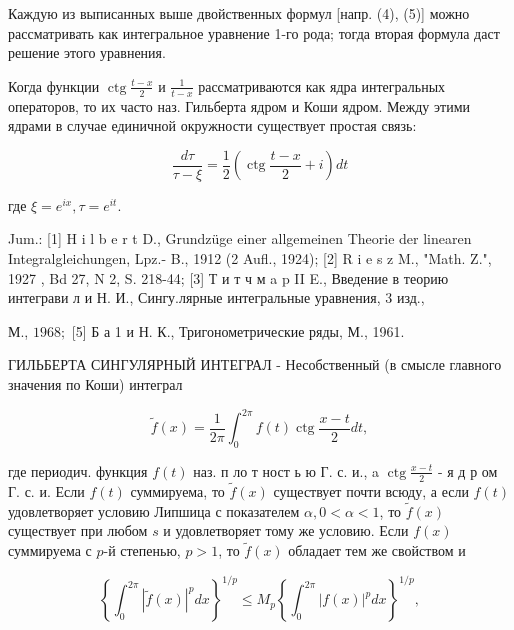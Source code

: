 \documentclass[10pt]{article}
\begin{document}
Каждую из выписанных выше двойственных формул [напр. (4), (5)] можно рассматривать как интегральное уравнение 1-го рода; тогда вторая формула даст решение этого уравнения.



Когда функции $\operatorname{ctg} \frac{t-x}{2}$ и $\frac{1}{t-x}$ рассматриваются как ядра интегральных операторов, то их часто наз. Гильберта ядром и Коши ядром. Между этими ядрами в случае единичной окружности существует простая связь:



\[

\frac{d \tau}{\tau-\xi}=\frac{1}{2}\left(\operatorname{ctg} \frac{t-x}{2}+i\right) d t

\]



где $\xi=e^{i x}, \tau=e^{i t}$.



Jum.: [1] H i l b e r t D., Grundzüge einer allgemeinen Theorie der linearen Integralgleichungen, Lpz.- B., 1912 (2 Aufl., 1924); [2] R i e s z M., "Math. Z.", 1927 , Bd 27, N 2, S. 218-44; [3] Т и т ч м a p II E., Введение в теорию интеграви л и Н. И., Сингу.лярные интегральные уравнения, 3 изд.,

М., $1968 ;$ [5] Б а 1 и Н. К., Тригонометрические ряды, М., 1961.



ГИЛЬБЕРТА СИНГУЛЯРНЫЙ ИНТЕГРАЛ - Несобственный (в смысле главного значения по Коши) интеграл



\[

\tilde{f}(x)=\frac{1}{2 \pi} \int_{0}^{2 \pi} f(t) \operatorname{ctg} \frac{x-t}{2} d t,

\]



где периодич. функция $f(t)$ наз. п ло т ност ь ю Г. с. и., a $\operatorname{ctg} \frac{x-t}{2}$ - я д р ом Г. с. и. Если $f(t)$ суммируема, то $\tilde{f}(x)$ существует почти всюду, а если $f(t)$ удовлетворяет условию Липшица с показателем $\alpha, 0<\alpha<1$, то $\tilde{f}(x)$ существует при любом $s$ и удовлетворяет тому же условию. Если $f(x)$ суммируема с $p$-й степенью, $p>1$, то $\tilde{f}(x)$ обладает тем же свойством и



\[

\left\{\int_{0}^{2 \pi}|\tilde{f}(x)|^{p} d x\right\}^{1 / p} \leqslant M_{p}\left\{\int_{0}^{2 \pi}|f(x)|^{p} d x\right\}^{1 / p},

\]
\end{document}
